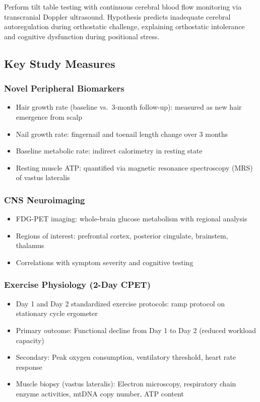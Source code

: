 \begin{achievement}
\label{ach:sed-aim5}
Perform tilt table testing with continuous cerebral blood flow monitoring via transcranial Doppler ultrasound. Hypothesis predicts inadequate cerebral autoregulation during orthostatic challenge, explaining orthostatic intolerance and cognitive dysfunction during positional stress.
\end{achievement}

\subsection{Key Study Measures}

\subsubsection{Novel Peripheral Biomarkers}
\begin{itemize}
    \item Hair growth rate (baseline vs.\ 3-month follow-up): measured as new hair emergence from scalp
    \item Nail growth rate: fingernail and toenail length change over 3 months
    \item Baseline metabolic rate: indirect calorimetry in resting state
    \item Resting muscle ATP: quantified via magnetic resonance spectroscopy (MRS) of vastus lateralis
\end{itemize}

\subsubsection{CNS Neuroimaging}
\begin{itemize}
    \item FDG-PET imaging: whole-brain glucose metabolism with regional analysis
    \item Regions of interest: prefrontal cortex, posterior cingulate, brainstem, thalamus
    \item Correlations with symptom severity and cognitive testing
\end{itemize}

\subsubsection{Exercise Physiology (2-Day CPET)}
\begin{itemize}
    \item Day 1 and Day 2 standardized exercise protocols: ramp protocol on stationary cycle ergometer
    \item Primary outcome: Functional decline from Day 1 to Day 2 (reduced workload capacity)
    \item Secondary: Peak oxygen consumption, ventilatory threshold, heart rate response
    \item Muscle biopsy (vastus lateralis): Electron microscopy, respiratory chain enzyme activities, mtDNA copy number, ATP content
\end{itemize}


